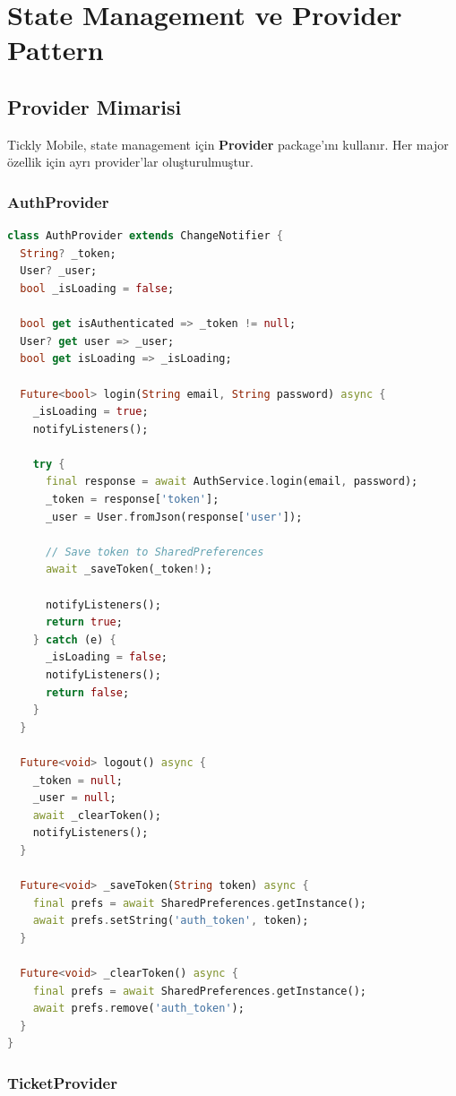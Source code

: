 \documentclass[12pt,a4paper]{article}
\begin{document}
\section{State Management ve Provider Pattern}

\subsection{Provider Mimarisi}

Tickly Mobile, state management için \textbf{Provider} package'ını kullanır. Her major özellik için ayrı provider'lar oluşturulmuştur.

\subsubsection{AuthProvider}

\begin{lstlisting}[language=Dart]
class AuthProvider extends ChangeNotifier {
  String? _token;
  User? _user;
  bool _isLoading = false;
  
  bool get isAuthenticated => _token != null;
  User? get user => _user;
  bool get isLoading => _isLoading;
  
  Future<bool> login(String email, String password) async {
    _isLoading = true;
    notifyListeners();
    
    try {
      final response = await AuthService.login(email, password);
      _token = response['token'];
      _user = User.fromJson(response['user']);
      
      // Save token to SharedPreferences
      await _saveToken(_token!);
      
      notifyListeners();
      return true;
    } catch (e) {
      _isLoading = false;
      notifyListeners();
      return false;
    }
  }
  
  Future<void> logout() async {
    _token = null;
    _user = null;
    await _clearToken();
    notifyListeners();
  }
  
  Future<void> _saveToken(String token) async {
    final prefs = await SharedPreferences.getInstance();
    await prefs.setString('auth_token', token);
  }
  
  Future<void> _clearToken() async {
    final prefs = await SharedPreferences.getInstance();
    await prefs.remove('auth_token');
  }
}
\end{lstlisting}

\subsubsection{TicketProvider}
\end{document}

